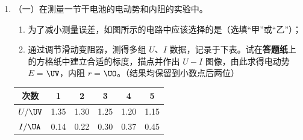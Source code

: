 \documentclass[\gkver]{gaokaozhenti}
\begin{document}
\begin{enumerate}
{

由几何关系有 $2a = R\cos\varphi + R$

解得 $a = \frac{3R}{4}$

C．根据几何关系可得椭圆的焦距 $2c = OO' = R\sin\varphi = \frac{\sqrt{3}R}{2}$，故 C 正确；

A．根据几何关系可得发射点离月面的高度 $h = a + c - R = \frac{\sqrt{3} - 1}{4}R$，故 A 错误；

B．设物体绕月球表面做匀速圆周运动时的周期为 $T_{0}$，则由重力提供向心力得 $mg_{\text{月}} = m\frac{4\pi^{2}}{T_{0}^{2}}R$

结合开普勒第三定律 $\frac{R^{3}}{T_{0}^{2}} = \frac{a^{3}}{T^{2}}$

联立可得物体沿椭圆运动的周期为 $T = \frac{3\pi}{4}\sqrt{\frac{3R}{g_{\text{月}}}}$，故 B 正确；

D．由引力势能公式 $E_{p} = -\frac{GMm}{r}$

结合万有引力公式 $m'g_{\text{月}} = G\frac{Mm'}{R^{2}}$

结合机械能守恒定律有 $-\frac{GMm'}{R + h} + \frac{1}{2}m'v^{2} = -\frac{GMm'}{R} + \frac{1}{2}m'v_{M}^{2}$

联立可得 $v_{M} = \sqrt{v^{2} + \frac{2g_{\text{月}}hR}{R + h}}$，故 D 错误。

故选 BC。
}

\item
（一）在测量一节干电池的电动势和内阻的实验中。


\begin{enumerate}
	\item
	为了减小测量误差，如图所示的电路中应该选择的是（选填“甲”或“乙”）；
	\item
	通过调节滑动变阻器，测得多组 $U$、$I$ 数据，记录于下表。试在\textbf{答题纸}上的方格纸中建立合适的标度，描点并作出 $U-I$ 图像，由此求得电动势 $E =$$\UV$，内阻 $r =$$\UO$。（结果均保留到小数点后两位）
\end{enumerate}

\begin{center}
\small
\begin{tabular}{|c|c|c|c|c|c|}
\hline
次数 & 1 & 2 & 3 & 4 & 5 \\
\hline
$U/\UV$ & 1.35 & 1.30 & 1.25 & 1.20 & 1.15 \\
\hline
$I/\UA$ & 0.14 & 0.22 & 0.30 & 0.37 & 0.45 \\
\hline
\end{tabular}
\end{center}


\end{enumerate}
\end{document}
